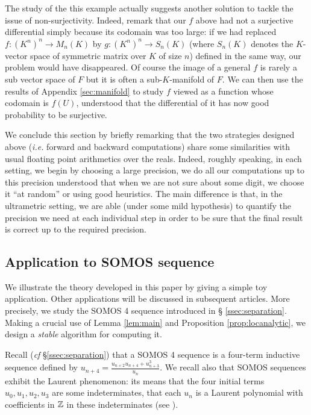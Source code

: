 \documentclass{lms}
\begin{document}
The study of the this example actually suggests another solution to 
tackle the issue of non-surjectivity. Indeed, remark that our $f$ above 
had not a surjective differential simply because its codomain was too 
large: if we had replaced $f : (K^n)^n \to M_n(K)$ by $g : (K^n)^n \to 
S_n(K)$ (where $S_n(K)$ denotes the $K$-vector space of symmetric matrix 
over $K$ of size $n$) defined in the same way, our problem would have 
disappeared. Of course the image of a general $f$ is rarely a sub vector 
space of $F$ but it is often a sub-$K$-manifold of $F$. We can then use 
the results of Appendix \ref{sec:manifold} to study $f$ viewed as a 
function whose codomain is $f(U)$, understood that the differential of 
it has now good probability to be surjective.

\medskip

We conclude this section by briefly remarking that the two strategies designed 
above (\emph{i.e.} forward and backward computations) share some 
similarities with usual floating point arithmetics over the reals. 
Indeed, roughly speaking, in each setting, we begin by choosing a large 
precision, we do all our computations up to this precision understood 
that when we are not sure about some digit, we choose it ``at random'' 
or using good heuristics. The main difference is that, in the 
ultrametric setting, we are able (under some mild hypothesis) to 
quantify the precision we need at each individual step in order to be 
sure that the final result is correct up to the required precision.

\subsection{Application to SOMOS sequence}
\label{ssec:SOMOS-solution}

We illustrate the theory developed in this paper by giving a simple 
toy application. Other applications will be discussed in subsequent 
articles. More precisely, we study the SOMOS 4 sequence introduced in \S 
\ref{ssec:separation}. Making a crucial use of Lemma \ref{lem:main} and 
Proposition \ref{prop:locanalytic}, we design a \emph{stable} algorithm 
for computing it.

Recall (\emph{cf} \S \ref{ssec:separation}) that a SOMOS 4 sequence is a 
four-term inductive sequence defined by $u_{n+4} = \frac{u_{n+2} u_{n+4} 
+ u_{n+3}^3}{u_n}$. We recall also that SOMOS sequences exhibit the 
Laurent phenomenon: its means that the four initial terms $u_0, u_1, 
u_2, u_3$ are some indeterminates, that each $u_n$ is a Laurent 
polynomial with coefficients in $\mathbb Z$ in these indeterminates
(see \cite{fomin-zelevinsky:02a}).
\end{document}
